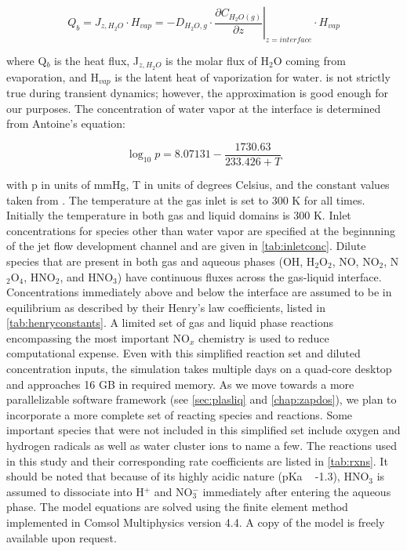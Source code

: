 \begin{equation}
    Q_b = J_{z,H_2O}\cdot H_{vap} = -D_{H_2O,g}\cdot \left.\frac{\partial C_{H_2O(g)}}{\partial z}\right|_{z=interface}\cdot H_{vap}
    \label{eq:vapheatsrc}
\end{equation}

where Q$_b$ is the heat flux, J$_{z,H_2O}$ is the molar flux of H$_2$O coming from evaporation, and H$_{vap}$ is the latent heat of vaporization for water.  is not strictly true during transient dynamics; however, the approximation is good enough for our purposes. The concentration of water vapor at the interface is determined from Antoine's equation: \cite{antoine1888thermodynamic}

\begin{equation}
    \log_{10}p = 8.07131 - \frac{1730.63}{233.426+T}
    \label{eq:Antoine}
\end{equation}

with p in units of mmHg, T in units of degrees Celsius, and the constant values taken from \cite{dimian2014integrated}.  The temperature at the gas inlet is set to 300 K for all times. Initially the temperature in both gas and liquid domains is 300 K. Inlet concentrations for species other than water vapor are specified at the beginnning of the jet flow development channel and are given in \cref{tab:inletconc}. Dilute species that are present in both gas and aqueous phases (OH, H$_2$O$_2$, NO, NO$_2$, N$_2$O$_4$, HNO$_2$, and HNO$_3$) have continuous fluxes across the gas-liquid interface. Concentrations immediately above and below the interface are assumed to be in equilibrium as described by their Henry's law coefficients, listed in \cref{tab:henryconstants}. A limited set of gas and liquid phase reactions encompassing the most important NO$_x$ chemistry is used to reduce computational expense. Even with this simplified reaction set and diluted concentration inputs, the simulation takes multiple days on a quad-core desktop and approaches 16 GB in required memory. As we move towards a more parallelizable software framework (see \cref{sec:plasliq} and \cref{chap:zapdos}), we plan to incorporate a more complete set of reacting species and reactions.  Some important species that were not included in this simplified set include oxygen and hydrogen radicals as well as water cluster ions to name a few. The reactions used in this study and their corresponding rate coefficients are listed in \cref{tab:rxns}. It should be noted that because of its highly acidic nature (pKa ~ -1.3), HNO$_3$ is assumed to dissociate into H$^+$ and NO$_3^-$ immediately after entering the aqueous phase. The model equations are solved using the finite element method implemented in Comsol Multiphysics version 4.4. A copy of the model is freely available upon request.

